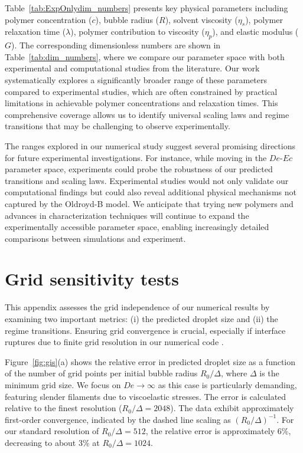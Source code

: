 \documentclass{jfm}
\newcommand{\oo}{\color{magenta} \normalfont}
\begin{document}
Table~\ref{tab:ExpOnlydim_numbers} presents key physical parameters including polymer concentration ($c$), bubble radius ($R$), solvent viscosity ($\eta_s$), polymer relaxation time ($\lambda$), polymer contribution to viscosity ($\eta_p$), and elastic modulus ($G$). The corresponding dimensionless numbers are shown in Table~\ref{tab:dim_numbers}, where we compare our parameter space with both experimental and computational studies from the literature. Our work systematically explores a significantly broader range of these parameters compared to experimental studies, which are often constrained by practical limitations in achievable polymer concentrations and relaxation times. This comprehensive coverage allows us to identify universal scaling laws and regime transitions that may be challenging to observe experimentally.

The ranges explored in our numerical study suggest several promising directions for future experimental investigations. For instance, while moving in the $De$-$Ec$ parameter space, experiments could probe the robustness of our predicted transitions and scaling laws. Experimental studies would not only validate our computational findings but could also reveal additional physical mechanisms not captured by the Oldroyd-B model. We anticipate that trying new polymers and advances in characterization techniques \citep{gaillard2024beware} will continue to expand the experimentally accessible parameter space, enabling increasingly detailed comparisons between simulations and experiment.

\oo
\section{Grid sensitivity tests}
\label{app:gis}
\renewcommand{\thefigure}{\Alph{section}\,\arabic{figure}}
\setcounter{figure}{0}

This appendix assesses the grid independence of our numerical results by examining two important metrics: (i) the predicted droplet size and (ii) the regime transitions. Ensuring grid convergence is crucial, especially if interface ruptures due to finite grid resolution in our numerical code \citep{lohse-2020-pnas,chirco2022manifold,kant2023bag}. 

Figure~\ref{fig:gis}(a) shows the relative error in predicted droplet size as a function of the number of grid points per initial bubble radius $R_0/\Delta$, where $\Delta$ is the minimum grid size. We focus on $De \to \infty$ as this case is particularly demanding, featuring slender filaments due to viscoelastic stresses. The error is calculated relative to the finest resolution ($R_0/\Delta = 2048$). 
The data exhibit approximately first-order convergence, indicated by the dashed line scaling as $(R_0/\Delta)^{-1}$. 
For our standard resolution of $R_0/\Delta = 512$, the relative error is approximately 6\%, decreasing to about 3\% at $R_0/\Delta = 1024$.
\end{document}
